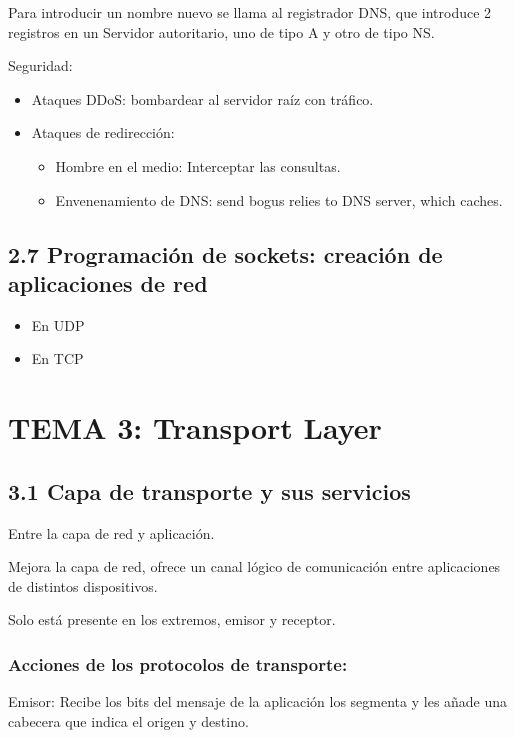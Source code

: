 \documentclass[12pt, twoside, openright]{report} %
\begin{document}
Para introducir un nombre nuevo se llama al registrador DNS, que
introduce 2 registros en un Servidor autoritario, uno de tipo A y
otro de tipo NS.

Seguridad:

\begin{itemize}
	\item Ataques DDoS: bombardear al servidor raíz con tráfico.
	\item Ataques de redirección:

	      \begin{itemize}
		      \item Hombre en el medio: Interceptar las consultas.
		      \item Envenenamiento de DNS: send bogus relies to DNS server, which
		            caches.
	      \end{itemize}
\end{itemize}

\section{2.7 Programación de sockets: creación de aplicaciones de red}

\begin{itemize}
	\item En UDP
	\item En TCP
\end{itemize}

\chapter{TEMA 3: Transport Layer}

\section{3.1 Capa de transporte y sus servicios}
Entre la capa de red y aplicación.

Mejora la capa de red, ofrece un canal lógico de comunicación entre
aplicaciones de distintos dispositivos.

Solo está presente en los extremos, emisor y receptor.

\subsection{Acciones de los protocolos de transporte:}


Emisor: Recibe los bits del mensaje de la aplicación los segmenta y
les añade una cabecera que indica el origen y destino.
\end{document}

